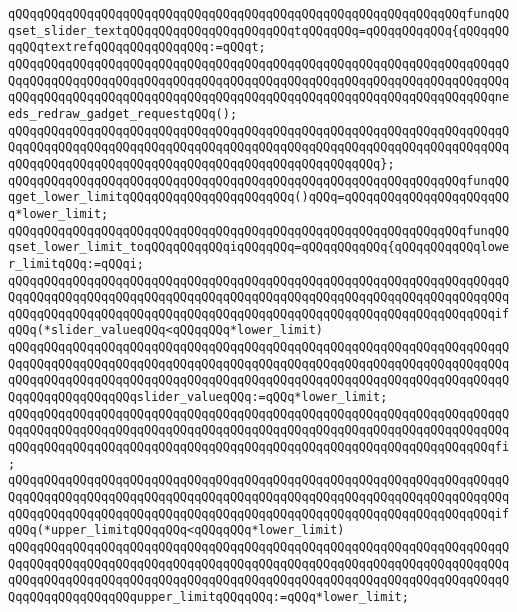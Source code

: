 \verb|qQQqqQQqqQQqqQQqqQQqqQQqqQQqqQQqqQQqqQQqqQQqqQQqqQQqqQQqqQQqqQQqfunqQQqset_slider_textqQQqqQQqqQQqqQQqqQQqqQQqtqQQqqQQq=qQQqqQQqqQQq{qQQqqQQqqQQqtextrefqQQqqQQqqQQqqQQq:=qQQqt;|\newline
\verb|qQQqqQQqqQQqqQQqqQQqqQQqqQQqqQQqqQQqqQQqqQQqqQQqqQQqqQQqqQQqqQQqqQQqqQQqqQQqqQQqqQQqqQQqqQQqqQQqqQQqqQQqqQQqqQQqqQQqqQQqqQQqqQQqqQQqqQQqqQQqqQQqqQQqqQQqqQQqqQQqqQQqqQQqqQQqqQQqqQQqqQQqqQQqqQQqqQQqqQQqqQQqqQQqneeds_redraw_gadget_requestqQQq();|\newline
\verb|qQQqqQQqqQQqqQQqqQQqqQQqqQQqqQQqqQQqqQQqqQQqqQQqqQQqqQQqqQQqqQQqqQQqqQQqqQQqqQQqqQQqqQQqqQQqqQQqqQQqqQQqqQQqqQQqqQQqqQQqqQQqqQQqqQQqqQQqqQQqqQQqqQQqqQQqqQQqqQQqqQQqqQQqqQQqqQQqqQQqqQQqqQQqqQQq};|\newline
\newline
\verb|qQQqqQQqqQQqqQQqqQQqqQQqqQQqqQQqqQQqqQQqqQQqqQQqqQQqqQQqqQQqqQQqfunqQQqget_lower_limitqQQqqQQqqQQqqQQqqQQqqQQq()qQQq=qQQqqQQqqQQqqQQqqQQqqQQq*lower_limit;|\newline
\verb|qQQqqQQqqQQqqQQqqQQqqQQqqQQqqQQqqQQqqQQqqQQqqQQqqQQqqQQqqQQqqQQqfunqQQqset_lower_limit_toqQQqqQQqqQQqiqQQqqQQq=qQQqqQQqqQQq{qQQqqQQqqQQqlower_limitqQQq:=qQQqi;|\newline
\verb|qQQqqQQqqQQqqQQqqQQqqQQqqQQqqQQqqQQqqQQqqQQqqQQqqQQqqQQqqQQqqQQqqQQqqQQqqQQqqQQqqQQqqQQqqQQqqQQqqQQqqQQqqQQqqQQqqQQqqQQqqQQqqQQqqQQqqQQqqQQqqQQqqQQqqQQqqQQqqQQqqQQqqQQqqQQqqQQqqQQqqQQqqQQqqQQqqQQqqQQqqQQqqQQqifqQQq(*slider_valueqQQq<qQQqqQQq*lower_limit)|\newline
\verb|qQQqqQQqqQQqqQQqqQQqqQQqqQQqqQQqqQQqqQQqqQQqqQQqqQQqqQQqqQQqqQQqqQQqqQQqqQQqqQQqqQQqqQQqqQQqqQQqqQQqqQQqqQQqqQQqqQQqqQQqqQQqqQQqqQQqqQQqqQQqqQQqqQQqqQQqqQQqqQQqqQQqqQQqqQQqqQQqqQQqqQQqqQQqqQQqqQQqqQQqqQQqqQQqqQQqqQQqqQQqqQQqqQQqslider_valueqQQq:=qQQq*lower_limit;|\newline
\verb|qQQqqQQqqQQqqQQqqQQqqQQqqQQqqQQqqQQqqQQqqQQqqQQqqQQqqQQqqQQqqQQqqQQqqQQqqQQqqQQqqQQqqQQqqQQqqQQqqQQqqQQqqQQqqQQqqQQqqQQqqQQqqQQqqQQqqQQqqQQqqQQqqQQqqQQqqQQqqQQqqQQqqQQqqQQqqQQqqQQqqQQqqQQqqQQqqQQqqQQqqQQqqQQqfi;|\newline
\verb|qQQqqQQqqQQqqQQqqQQqqQQqqQQqqQQqqQQqqQQqqQQqqQQqqQQqqQQqqQQqqQQqqQQqqQQqqQQqqQQqqQQqqQQqqQQqqQQqqQQqqQQqqQQqqQQqqQQqqQQqqQQqqQQqqQQqqQQqqQQqqQQqqQQqqQQqqQQqqQQqqQQqqQQqqQQqqQQqqQQqqQQqqQQqqQQqqQQqqQQqqQQqqQQqifqQQq(*upper_limitqQQqqQQq<qQQqqQQq*lower_limit)|\newline
\verb|qQQqqQQqqQQqqQQqqQQqqQQqqQQqqQQqqQQqqQQqqQQqqQQqqQQqqQQqqQQqqQQqqQQqqQQqqQQqqQQqqQQqqQQqqQQqqQQqqQQqqQQqqQQqqQQqqQQqqQQqqQQqqQQqqQQqqQQqqQQqqQQqqQQqqQQqqQQqqQQqqQQqqQQqqQQqqQQqqQQqqQQqqQQqqQQqqQQqqQQqqQQqqQQqqQQqqQQqqQQqqQQqqQQqupper_limitqQQqqQQq:=qQQq*lower_limit;|\newline
